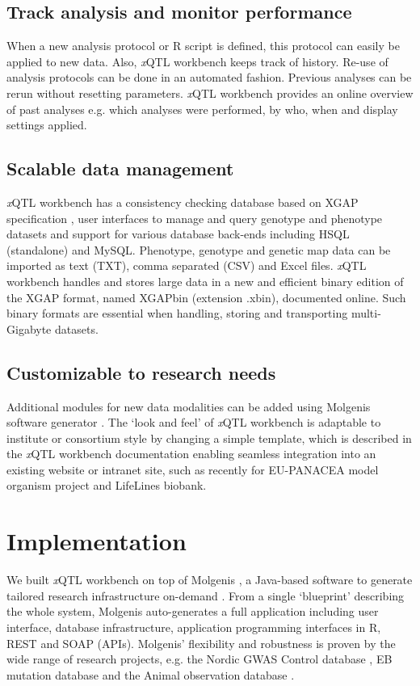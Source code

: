 \subsection{Track analysis and monitor performance}
When a new analysis protocol or R script is defined, this protocol can easily be applied to new data. Also, \textsl{x}QTL workbench keeps track of history. Re-use of analysis protocols can be done in an automated fashion. Previous analyses can be rerun without resetting parameters. \textsl{x}QTL workbench provides an online overview of past analyses e.g. which analyses were performed, by who, when and display settings applied.

\subsection{Scalable data management}
\textsl{x}QTL workbench has a consistency checking database based on XGAP specification \cite{Swertz_2010b}, user interfaces to manage and query genotype and phenotype datasets and support for various database back-ends including HSQL (standalone) and MySQL. Phenotype, genotype and genetic map data can be imported as text (TXT), comma separated (CSV) and Excel files. \textsl{x}QTL workbench handles and stores large data in a new and efficient binary edition of the XGAP format, named XGAPbin (extension .xbin), documented online. Such binary formats are essential when handling, storing and transporting multi-Gigabyte datasets.

\subsection{Customizable to research needs}
Additional modules for new data modalities can be added using Molgenis software generator \cite{Swertz_2010b}.
The ‘look and feel’ of \textsl{x}QTL workbench is adaptable to institute or consortium style by changing a simple template, which is described in the \textsl{x}QTL workbench documentation enabling seamless integration into an existing website or intranet site, such as recently for EU-PANACEA model organism project and LifeLines biobank.

\section{Implementation}
We built \textsl{x}QTL workbench on top of Molgenis \cite{Swertz_2004}, a Java-based software to generate tailored research infrastructure on-demand \cite{Swertz_2007}. From a single ‘blueprint’ describing the whole system, Molgenis auto-generates a full application including user interface, database infrastructure, application programming interfaces in R, REST and SOAP (APIs). Molgenis' flexibility and robustness is proven by the wide range of research projects, e.g. the Nordic GWAS Control database \cite{Leu_2010}, EB mutation database \cite{van_den_Akker_2011} and the Animal observation database \cite{Swertz_2010a}.

